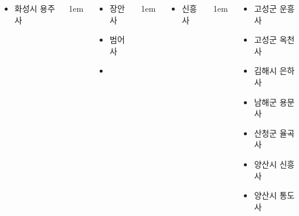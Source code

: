 \documentclass[	20pt, 
							a0paper, 
							landscape,
							margin=0mm, %
							innermargin=10mm,  		%
							blockverticalspace=4mm, %
							colspace=5mm, 
							subcolspace=0mm
							]{tikzposter}
\begin{document}
\begin{columns}
{\begin{LARGE}
\begin{itemize}
					\item 화성시 용주사
					\end{itemize}
				\end{LARGE}
			} %


			{
					\setlength{\leftmargini}{4em}
					\setlength{\labelsep} {1em}
				\begin{LARGE}
					\begin{itemize}
					\item 장안사
					\item 범어사
					\item 
					\end{itemize}
				\end{LARGE}
			} %



			{
					\setlength{\leftmargini}{4em}
					\setlength{\labelsep} {1em}
				\begin{LARGE}
					\begin{itemize}
					\item 신흥사
					\end{itemize}
				\end{LARGE}
			} %


			{
					\setlength{\leftmargini}{4em}
					\setlength{\labelsep} {1em}
				\begin{LARGE}
					\begin{itemize}
					\item 고성군 운흥사
					\item 고성군 옥천사

					\item 김해시 은하사

					\item 남해군 용문사

					\item 산청군 율곡사 

					\item 양산시 신흥사
					\item 양산시 통도사


\end{itemize}
\end{LARGE}}
\end{columns}
\end{document}
